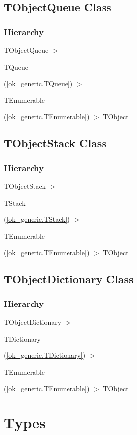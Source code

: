 \documentclass{report}
\begin{document}
\subsection*{TObjectQueue Class}
\subsubsection*{\large{\textbf{Hierarchy}}\normalsize\hspace{1ex}\hfill}
TObjectQueue {$>$} \begin{ttfamily}TQueue\end{ttfamily}(\ref{ok_generic.TQueue}) {$>$} \begin{ttfamily}TEnumerable\end{ttfamily}(\ref{ok_generic.TEnumerable}) {$>$} 
TObject
\subsection*{TObjectStack Class}
\subsubsection*{\large{\textbf{Hierarchy}}\normalsize\hspace{1ex}\hfill}
TObjectStack {$>$} \begin{ttfamily}TStack\end{ttfamily}(\ref{ok_generic.TStack}) {$>$} \begin{ttfamily}TEnumerable\end{ttfamily}(\ref{ok_generic.TEnumerable}) {$>$} 
TObject
\subsection*{TObjectDictionary Class}
\subsubsection*{\large{\textbf{Hierarchy}}\normalsize\hspace{1ex}\hfill}
TObjectDictionary {$>$} \begin{ttfamily}TDictionary\end{ttfamily}(\ref{ok_generic.TDictionary}) {$>$} \begin{ttfamily}TEnumerable\end{ttfamily}(\ref{ok_generic.TEnumerable}) {$>$} 
TObject
\section{Types}
\end{document}
